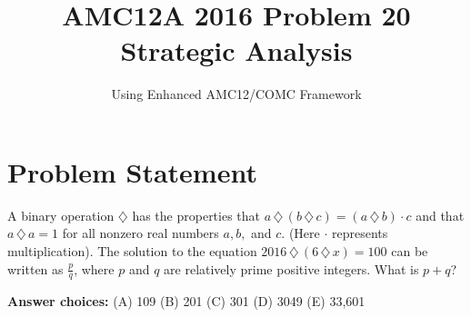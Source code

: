 \documentclass[11pt]{article}
\title{\textbf{AMC12A 2016 Problem 20 Strategic Analysis}}
\author{Using Enhanced AMC12/COMC Framework}
\date{}
\begin{document}
\maketitle

\section*{Problem Statement}
A binary operation $\diamondsuit$ has the properties that $a\,\diamondsuit\, (b\,\diamondsuit \,c) = (a\,\diamondsuit \,b)\cdot c$ and that $a\,\diamondsuit \,a=1$ for all nonzero real numbers $a, b,$ and $c$. (Here $\cdot$ represents multiplication). The solution to the equation $2016 \,\diamondsuit\, (6\,\diamondsuit\, x)=100$ can be written as $\tfrac{p}{q}$, where $p$ and $q$ are relatively prime positive integers. What is $p+q$?

\textbf{Answer choices:} (A) 109 \quad (B) 201 \quad (C) 301 \quad (D) 3049 \quad (E) 33,601
\end{document}
